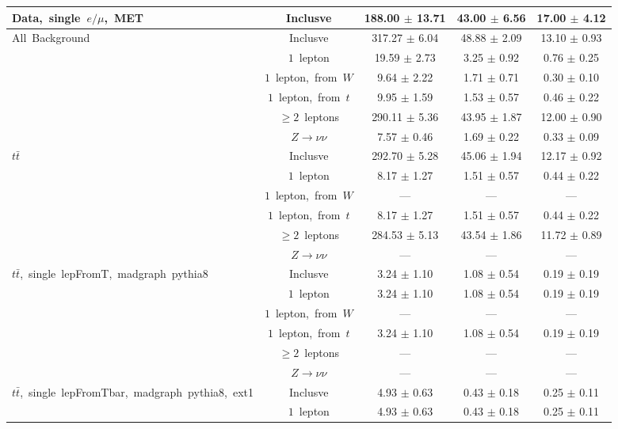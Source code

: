 \documentclass{article}
\begin{document}
\begin{longtable}{|l|c|c|c|c|}
\multirow{1}{*}{Data,~single~$e/\mu$,~MET} & Inclusve  & 188.00 $\pm$ 13.71  & 43.00 $\pm$ 6.56  & 17.00 $\pm$ 4.12 \\* 
\hline \hline 
\multirow{6}{*}{All~Background} & Inclusve  & 317.27 $\pm$ 6.04  & 48.88 $\pm$ 2.09  & 13.10 $\pm$ 0.93 \\* 
 & $1$~lepton  & 19.59 $\pm$ 2.73  & 3.25 $\pm$ 0.92  & 0.76 $\pm$ 0.25 \\* 
 & $1$~lepton,~from~$W$  & 9.64 $\pm$ 2.22  & 1.71 $\pm$ 0.71  & 0.30 $\pm$ 0.10 \\* 
 & $1$~lepton,~from~$t$  & 9.95 $\pm$ 1.59  & 1.53 $\pm$ 0.57  & 0.46 $\pm$ 0.22 \\* 
 & $\ge2$~leptons  & 290.11 $\pm$ 5.36  & 43.95 $\pm$ 1.87  & 12.00 $\pm$ 0.90 \\* 
 & $Z\rightarrow\nu\nu$  & 7.57 $\pm$ 0.46  & 1.69 $\pm$ 0.22  & 0.33 $\pm$ 0.09 \\* 
\hline 
\multirow{6}{*}{$t\bar{t}$} & Inclusve  & 292.70 $\pm$ 5.28  & 45.06 $\pm$ 1.94  & 12.17 $\pm$ 0.92 \\* 
 & $1$~lepton  & 8.17 $\pm$ 1.27  & 1.51 $\pm$ 0.57  & 0.44 $\pm$ 0.22 \\* 
 & $1$~lepton,~from~$W$  & ---  & ---  & --- \\* 
 & $1$~lepton,~from~$t$  & 8.17 $\pm$ 1.27  & 1.51 $\pm$ 0.57  & 0.44 $\pm$ 0.22 \\* 
 & $\ge2$~leptons  & 284.53 $\pm$ 5.13  & 43.54 $\pm$ 1.86  & 11.72 $\pm$ 0.89 \\* 
 & $Z\rightarrow\nu\nu$  & ---  & ---  & --- \\* 
\hline 
\multirow{6}{*}{$t\bar{t}$,~single~lepFromT,~madgraph~pythia8} & Inclusve  & 3.24 $\pm$ 1.10  & 1.08 $\pm$ 0.54  & 0.19 $\pm$ 0.19 \\* 
 & $1$~lepton  & 3.24 $\pm$ 1.10  & 1.08 $\pm$ 0.54  & 0.19 $\pm$ 0.19 \\* 
 & $1$~lepton,~from~$W$  & ---  & ---  & --- \\* 
 & $1$~lepton,~from~$t$  & 3.24 $\pm$ 1.10  & 1.08 $\pm$ 0.54  & 0.19 $\pm$ 0.19 \\* 
 & $\ge2$~leptons  & ---  & ---  & --- \\* 
 & $Z\rightarrow\nu\nu$  & ---  & ---  & --- \\* 
\hline 
\multirow{6}{*}{$t\bar{t}$,~single~lepFromTbar,~madgraph~pythia8,~ext1} & Inclusve  & 4.93 $\pm$ 0.63  & 0.43 $\pm$ 0.18  & 0.25 $\pm$ 0.11 \\* 
 & $1$~lepton  & 4.93 $\pm$ 0.63  & 0.43 $\pm$ 0.18  & 0.25 $\pm$ 0.11 \\* 

\end{longtable}
\end{document}

